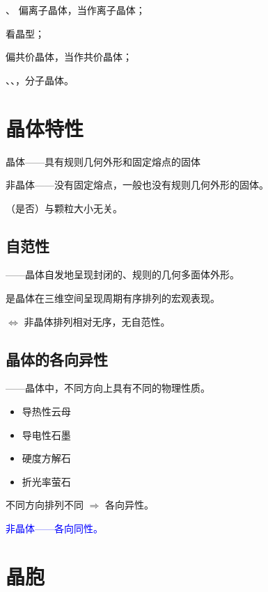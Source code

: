             、 偏离子晶体，当作离子晶体；

             看晶型；

             偏共价晶体，当作共价晶体；

            、、，分子晶体。

    \section{晶体特性}\label{sect:晶体特性}

        晶体——具有规则几何外形和固定熔点的固体

        非晶体——没有固定熔点，一般也没有规则几何外形的固体。

        （是否）与颗粒大小无关。

        \subsection{自范性}\label{subsec:自范性}

            ——晶体自发地呈现封闭的、规则的几何多面体外形。

            是晶体在三维空间呈现周期有序排列的宏观表现。

            \(\Leftrightarrow\) 非晶体排列相对无序，无自范性。

        \subsection{晶体的各向异性}\label{subsec:各向异性}

            ——晶体中，不同方向上具有不同的物理性质。

            \begin{itemize}
                \item 导热性\quad 云母
                \item 导电性\quad 石墨
                \item 硬度\qquad 方解石
                \item 折光率\quad 萤石
            \end{itemize}

            不同方向排列不同 \(\Rightarrow\) 各向异性。

            \textcolor{blue}{非晶体——各向同性。}

    \section{晶胞}\label{sect:晶胞}


